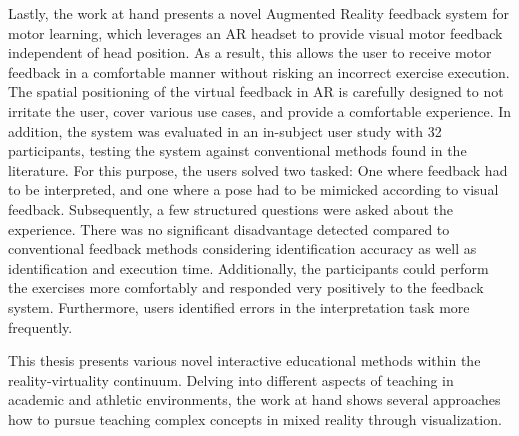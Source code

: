 Lastly, the work at hand presents a novel Augmented Reality feedback system for motor learning, which leverages an AR headset to provide visual motor feedback independent of head position.
As a result, this allows the user to receive motor feedback in a comfortable manner without risking an incorrect exercise execution.
The spatial positioning of the virtual feedback in AR is carefully designed to not irritate the user, cover various use cases, and provide a comfortable experience.
In addition, the system was evaluated in an in-subject user study with 32 participants, testing the system against conventional methods found in the literature.
For this purpose, the users solved two tasked: One where feedback had to be interpreted, and one where a pose had to be mimicked according to visual feedback.
Subsequently, a few structured questions were asked about the experience.
There was no significant disadvantage detected compared to conventional feedback methods considering identification accuracy as well as identification and execution time.
Additionally, the participants could perform the exercises more comfortably and responded very positively to the feedback system.
Furthermore, users identified errors in the interpretation task more frequently.

This thesis presents various novel interactive educational methods within the reality-virtuality continuum.
Delving into different aspects of teaching in academic and athletic environments, the work at hand shows several approaches how to pursue teaching complex concepts in mixed reality through visualization.